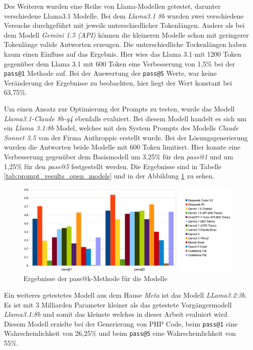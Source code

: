 Des Weiteren wurden eine Reihe von Llama-Modellen getestet, darunter verschiedene Llama3.1 Modelle. Bei dem \textit{Llama3.1 8b} wurden zwei verschiedene Versuche durchgeführt mit jeweils unterschiedlicher Tokenlängen. Anders als bei dem Modell \textit{Gemini 1.5 (API)} können die kleineren Modelle schon mit geringerer Tokenlänge valide Antworten erzeugen. Die unterschiedliche Tockenlängen haben kaum einen Einfluss auf das Ergebnis. Hier wies das Llama 3.1 mit 1200 Token gegenüber dem Llama 3.1 mit 600 Token eine Verbesserung von 1,5\% bei der \texttt{pass@1} Methode auf. Bei der Auswertung der \texttt{pass@5} Werte, war keine Veränderung der Ergebnisse zu beobachten, hier liegt der Wert konstant bei 63,75\%.\vspace{0.2cm}

Um einen Ansatz zur Optimierung der Prompts zu testen, wurde das Modell \textit{Llama3.1-Claude 8b-q4} ebenfalls evaluiert. Bei diesem Modell handelt es sich um ein \textit{Llama 3.1:8b} Model, welches mit den System Prompts des Modells \textit{Claude Sonnet 3.5} von der Firma Anthroppic erstellt wurde. Bei der Lösungsgenerierung wurden die Antworten beide Modelle mit 600 Token limitiert. Hier konnte eine Verbesserung gegenüber dem Basismodell um 3,25\% für den \textit{pass@1} und um 1,25\% für den \textit{pass@5} festgestellt werden. Die Ergebnisse sind in Tabelle \ref{tab:prompt_results_open_models} und in der Abbildung \ref{img:pass_at_k_results_by_llm} zu sehen.\vspace{0.2cm}

\begin{figure}[!ht]
	\includegraphics[width=\textwidth]{content/chapter_evaluation/images/llm_evaluation.eps}
	\centering
	\caption{Ergebnisse der pass@k-Methode für die Modelle}
	\label{img:pass_at_k_results_by_llm}
\end{figure}

Ein weiteres getestetes Modell aus dem Hause \textit{Meta} ist das Modell \textit{LLama3.2:3b}. Es ist mit 3 Milliarden Parameter kleiner als das getestete Vorgängermodell \textit{Llama3.1:8b} und somit das kleinste welches in dieser Arbeit evaluiert wird. Diesem Modell erzielte bei der Generierung von PHP Code, beim \texttt{pass@1} eine Wahrscheinlichkeit von 26,25\% und beim \texttt{pass@5} eine Wahrscheinlichkeit von 55\%.\vspace{0.2cm}

